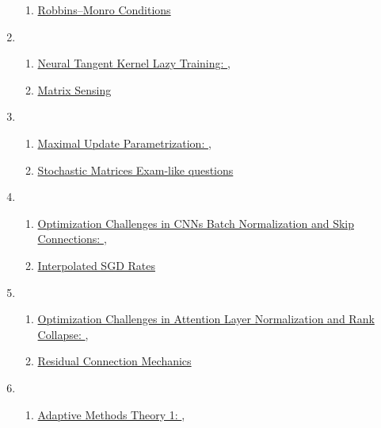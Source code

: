 \documentclass[11pt]{article}
\begin{document}
\begin{enumerate}
\begin{enumerate}
		\item \href{https://mp.weixin.qq.com/s/9aNCck1Q_Hb9axjQHbHnqg}{Robbins–Monro Conditions} %
	\end{enumerate}
	\item  %
	\begin{enumerate}
		\item  \href{https://mp.weixin.qq.com/s/3i5GP_CLLsgs7l5nRm_MmA}{Neural Tangent Kernel Lazy Training: },\quad \href{https://mp.weixin.qq.com/s/OIA87U8jvMjWpD8Byy9aQw}{} %
		\item \href{https://mp.weixin.qq.com/s/fMA5g-zcjDWDdPDX2PjBOg}{Matrix Sensing} %
	\end{enumerate}
	\item  %
	\begin{enumerate}
		\item  \href{https://mp.weixin.qq.com/s/6VHAETbBoHOacsdXOwjZlQ}{Maximal Update Parametrization: },\quad \href{https://mp.weixin.qq.com/s/oyiTWLnI62kU0KIxqDYfiA}{} %
		\item \href{https://mp.weixin.qq.com/s/1KE6_h7KE_soYOxqMd7jJA}{Stochastic Matrices Exam-like questions} %
	\end{enumerate}
	\item  %
	\begin{enumerate}
		\item  \href{https://mp.weixin.qq.com/s/_VPrZPIBw3VHopQkxdAA4w}{Optimization Challenges in CNNs Batch Normalization and Skip Connections: },\quad \href{https://mp.weixin.qq.com/s/4vA8Cah6hbxu-dbdj5nI1g}{} %
		\item \href{https://mp.weixin.qq.com/s/aSQ7-GfrtoUT5ME3BCjq6Q}{Interpolated SGD Rates} %
	\end{enumerate}
	\item  %
	\begin{enumerate}
		\item  \href{https://mp.weixin.qq.com/s/cMvvBYbTHX0X3E23sASbnw}{Optimization Challenges in Attention Layer Normalization and Rank Collapse: },\quad \href{https://mp.weixin.qq.com/s/-Gkk1DshUyTJ96cx9vevoA}{} %
		\item \href{https://mp.weixin.qq.com/s/GTd-kA86muXfernJfDtYAA}{Residual Connection Mechanics} %
	\end{enumerate}
	\item  %
	\begin{enumerate}
		\item \href{https://mp.weixin.qq.com/s/p0gSUME4UIfh5bFxL1-G0A}{Adaptive Methods Theory 1:  },\quad \href{https://mp.weixin.qq.com/s/DiiHjfSKJEvultKFKHiycQ}{}  %

\end{enumerate}
\end{enumerate}
\end{document}
